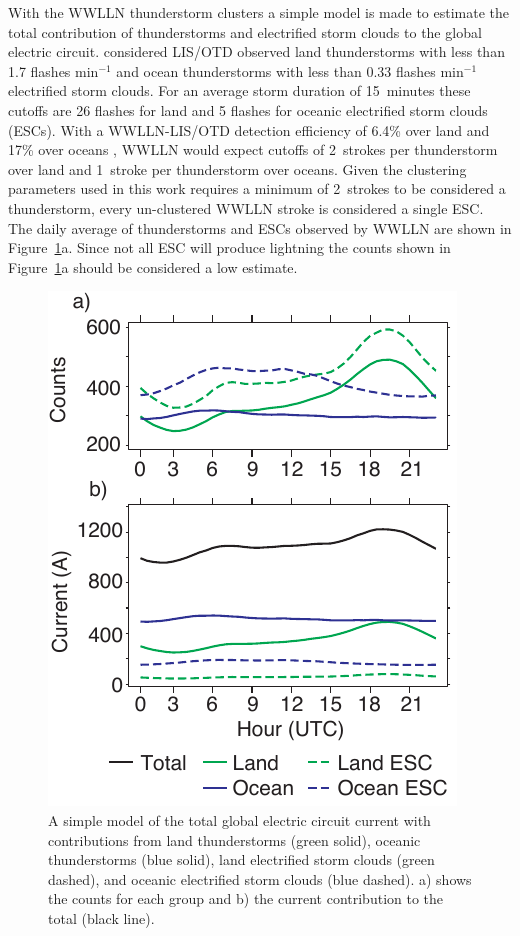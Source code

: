 With the WWLLN thunderstorm clusters a simple model is made to estimate the total contribution of thunderstorms and electrified storm clouds to the global electric circuit.
\citet{Mach2011} considered LIS/OTD observed land thunderstorms with less than 1.7 flashes min$^{-1}$ and ocean thunderstorms with less than 0.33 flashes min$^{-1}$ electrified storm clouds.
For an average storm duration of 15~minutes these cutoffs are 26 flashes for land and 5 flashes for oceanic electrified storm clouds (ESCs).
With a WWLLN-LIS/OTD detection efficiency of 6.4\% over land and 17\% over oceans \citep{Rudlosky2013}, WWLLN would expect cutoffs of 2~strokes per thunderstorm over land and 1~stroke per thunderstorm over oceans.
Given the clustering parameters used in this work requires a minimum of 2~strokes to be considered a thunderstorm, every un-clustered WWLLN stroke is considered a single ESC.
The daily average of thunderstorms and ESCs observed by WWLLN are shown in Figure~\ref{gec:fig:wilson}a.
Since not all ESC will produce lightning the counts shown in Figure~\ref{gec:fig:wilson}a should be considered a low estimate.

  \begin{figure}[ht!]
    \centering
    \includegraphics[scale=1]{GEC/Figures/wilson.pdf}
    \caption{A simple model of the total global electric circuit current with contributions from land thunderstorms (green solid), oceanic thunderstorms (blue solid), land electrified storm clouds (green dashed), and oceanic electrified storm clouds (blue dashed).
    		a) shows the counts for each group and b) the current contribution to the total (black line).
		}
    \label{gec:fig:wilson}
 \end{figure}

